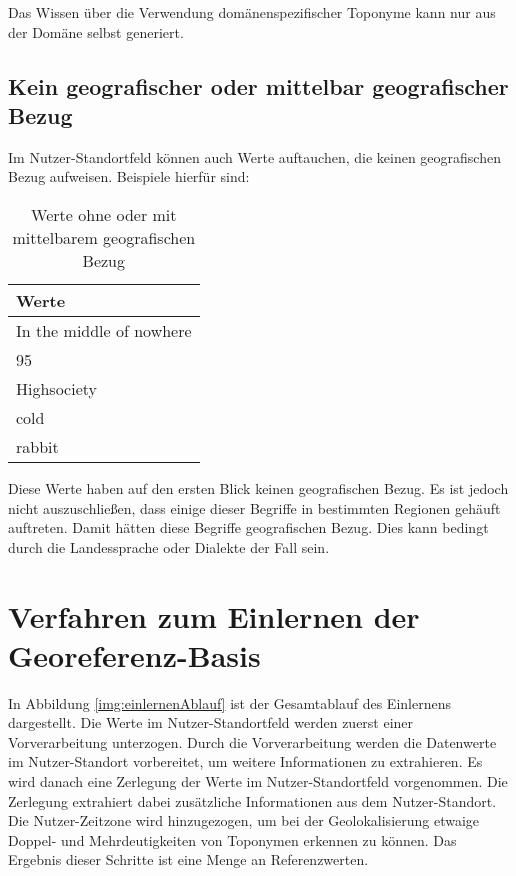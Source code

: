			Das Wissen über die Verwendung domänenspezifischer Toponyme kann nur aus der Domäne selbst generiert.
		
		\subsection{Kein geografischer oder mittelbar geografischer Bezug} \label{sub:keinGeogOdMittelBarereBezug}

			Im Nutzer-Standortfeld können auch Werte auftauchen, die keinen geografischen Bezug aufweisen.
			Beispiele hierfür sind:

			\begin{table}[h]
			\centering
			\caption{Werte ohne oder mit mittelbarem geografischen Bezug}
			\label{tab:keinOderMittelbarBezug}
			\begin{tabular}{|l|}
			\hline
			Werte                      	\\ \hline
			In the middle of nowhere   	\\ \hline
			95                         	\\ \hline
			Highsociety                	\\ \hline
			cold	                 	\\ \hline
			rabbit     					\\ \hline
			\end{tabular}
			\end{table}

			Diese Werte haben auf den ersten Blick keinen geografischen Bezug.
			Es ist jedoch nicht auszuschließen, dass einige dieser Begriffe in bestimmten Regionen gehäuft auftreten.
			Damit hätten diese Begriffe geografischen Bezug.
			Dies kann bedingt durch die Landessprache oder Dialekte der Fall sein.

	\section{Verfahren zum Einlernen der Georeferenz-Basis} \label{sec:VefrahrenZumEinlernen} 	
			
			In Abbildung \ref{img:einlernenAblauf} ist der Gesamtablauf des Einlernens dargestellt. 
			Die Werte im Nutzer-Standortfeld werden zuerst einer Vorverarbeitung unterzogen. 
			Durch die Vorverarbeitung werden die Datenwerte im Nutzer-Standort vorbereitet, um weitere Informationen zu extrahieren.
			Es wird danach eine Zerlegung der Werte im Nutzer-Standortfeld vorgenommen.
			Die Zerlegung extrahiert dabei zusätzliche Informationen aus dem Nutzer-Standort.
			Die Nutzer-Zeitzone wird hinzugezogen, um bei der Geolokalisierung etwaige Doppel- und Mehrdeutigkeiten von Toponymen erkennen zu können.
			Das Ergebnis dieser Schritte ist eine Menge an Referenzwerten.

